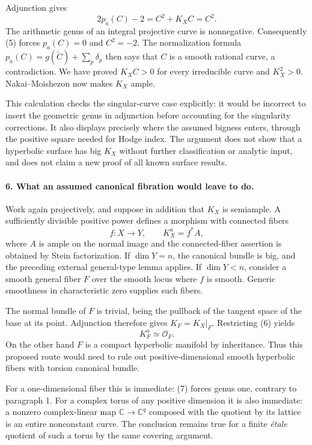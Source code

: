 \documentclass[11pt]{article}
\begin{document}
Adjunction gives
\[
 2p_a(C)-2=C^2+K_XC=C^2.                               \tag{5}
\]
The arithmetic genus of an integral projective curve is nonnegative. Consequently (5) forces $p_a(C)=0$ and $C^2=-2$. The normalization formula $p_a(C)=g(\widetilde C)+\sum_p\delta_p$ then says that $C$ is a smooth rational curve, a contradiction. We have proved $K_XC>0$ for every irreducible curve and $K_X^2>0$. Nakai--Moishezon now makes $K_X$ ample.

This calculation checks the singular-curve case explicitly: it would be incorrect to insert the geometric genus in adjunction before accounting for the singularity corrections. It also displays precisely where the assumed bigness enters, through the positive square needed for Hodge index. The argument does not show that a hyperbolic surface has big $K_X$ without further classification or analytic input, and does not claim a new proof of all known surface results.

\paragraph{6. What an assumed canonical fibration would leave to do.}
Work again projectively, and suppose in addition that $K_X$ is semiample. A sufficiently divisible positive power defines a morphism with connected fibers
\[
 f:X\longrightarrow Y,\qquad K_X^a=f^*A,               \tag{6}
\]
where $A$ is ample on the normal image and the connected-fiber assertion is obtained by Stein factorization. If $\dim Y=n$, the canonical bundle is big, and the preceding external general-type lemma applies. If $\dim Y<n$, consider a smooth general fiber $F$ over the smooth locus where $f$ is smooth. Generic smoothness in characteristic zero supplies such fibers.

The normal bundle of $F$ is trivial, being the pullback of the tangent space of the base at its point. Adjunction therefore gives $K_F=K_X|_F$. Restricting (6) yields
\[
 K_F^a\simeq\mathcal O_F.                              \tag{7}
\]
On the other hand $F$ is a compact hyperbolic manifold by inheritance. Thus this proposed route would need to rule out positive-dimensional smooth hyperbolic fibers with torsion canonical bundle.

For a one-dimensional fiber this is immediate: (7) forces genus one, contrary to paragraph 1. For a complex torus of any positive dimension it is also immediate: a nonzero complex-linear map $\mathbb C\to\mathbb C^q$ composed with the quotient by its lattice is an entire nonconstant curve. The conclusion remains true for a finite \emph{\'etale} quotient of such a torus by the same covering argument.
\end{document}
